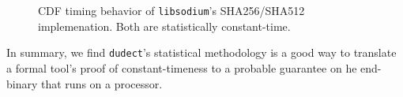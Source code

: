 \begin{figure}[h!]
  \centering
  \label{fig:dudect_sha256}
  \label{fig:dudect_sha512}
  \caption{CDF timing behavior of \texttt{libsodium}'s SHA256/SHA512 implemenation. Both are statistically constant-time.}
  \label{fig:dudect_sha}
\end{figure}

In summary, we find \texttt{dudect}'s statistical methodology is a good way to translate a formal tool's proof of
constant-timeness to a probable guarantee on he end-binary that runs on a processor.

